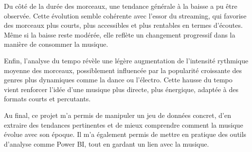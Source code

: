 \documentclass[french]{article}
\newcommand{\newLine}{\vspace{0.2cm}}
\begin{document}
\newLine

Du côté de la durée des morceaux, une tendance générale à la baisse a pu être observée. Cette évolution semble cohérente avec l'essor du streaming, qui favorise des morceaux plus courts, plus accessibles et plus rentables en termes d'écoutes. Même si la baisse reste modérée, elle reflète un changement progressif dans la manière de consommer la musique.

\newLine

Enfin, l'analyse du tempo révèle une légère augmentation de l'intensité rythmique moyenne des morceaux, possiblement influencée par la popularité croissante des genres plus dynamiques comme la dance ou l'électro. Cette hausse du tempo vient renforcer l'idée d'une musique plus directe, plus énergique, adaptée à des formats courts et percutants.

\newLine

Au final, ce projet m'a permis de manipuler un jeu de données concret, d'en extraire des tendances pertinentes et de mieux comprendre comment la musique évolue avec son époque. Il m'a également permis de mettre en pratique des outils d'analyse comme Power BI, tout en gardant un lien avec la musique.
\end{document}
